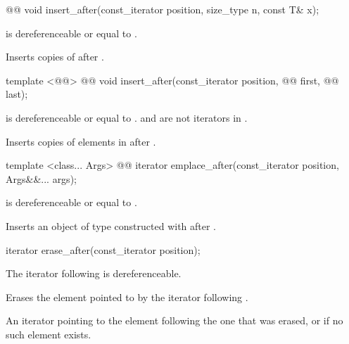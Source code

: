 \documentclass[american,twoside]{book}
\begin{document}
\begin{itemdecl}
@@ 
  void insert_after(const_iterator position, size_type n, const T& x);
\end{itemdecl}

\begin{itemdescr}
\pnum
\requires {} is dereferenceable or equal to .

\pnum
\effects Inserts  copies of  after .
\end{itemdescr}

\begin{itemdecl}
template <@@> 
  @@
  void insert_after(const_iterator position, @@ first, @@ last);
\end{itemdecl}

\begin{itemdescr}
\pnum
\requires {} is dereferenceable or equal to .  and  are not iterators in .

\pnum
\effects Inserts copies of elements in  after .
\end{itemdescr}

\begin{itemdecl}
template <class... Args>
  @@ 
  iterator emplace_after(const_iterator position, Args&&... args);
\end{itemdecl}

\begin{itemdescr}
\pnum
\requires {} is dereferenceable or equal to .

\pnum
\effects Inserts an object of type  constructed with  after .
\end{itemdescr}

\begin{itemdecl}
iterator erase_after(const_iterator position);
\end{itemdecl}

\begin{itemdescr}
\pnum
\requires The iterator following  is dereferenceable.

\pnum
\effects Erases the element pointed to by the iterator following .

\pnum
\returns An iterator pointing to the element following the one that was erased, or  if no such element exists.
\end{itemdescr}
\end{document}
